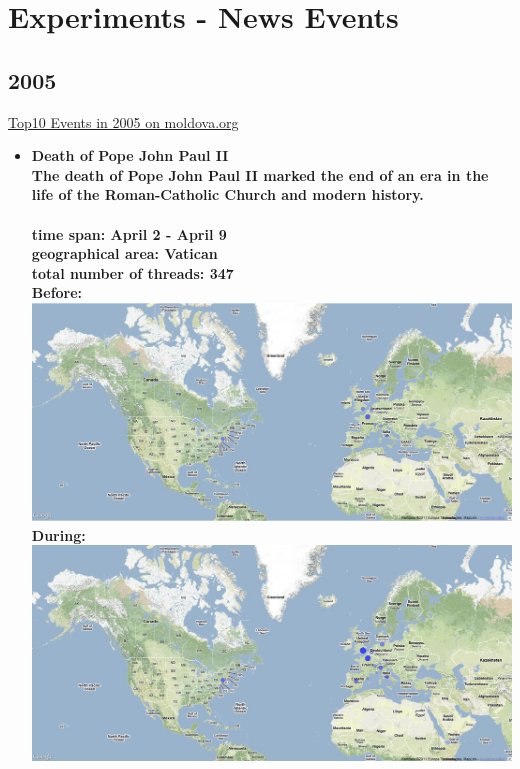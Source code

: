 \documentclass[11pt,a4paper,english]{article}
\begin{document}
 \newpage

	\section{Experiments - News Events}
			\subsection{2005}
			\href{http://politicom.moldova.org/news/10-most-important-world-events-of-2005-7712-eng.html}{Top10 Events in 2005 on moldova.org}
				\begin{itemize}
				\item \bf Death of Pope John Paul II\rm
					\\ The death of Pope John Paul II marked the end of an era in the life of the Roman-Catholic Church and modern history. 
					\\\\ \bf time span: \rm April 2 - April 9
					\\ \bf geographical area: \rm Vatican
					\\ \bf total number of threads: \rm 347
					\\ \bf Before: \rm
					\includegraphics[width=130mm]{img/pre-pope}
					\\ \bf During: \rm
					\includegraphics[width=130mm]{img/post-pope}
						

\end{itemize}
\end{document}
